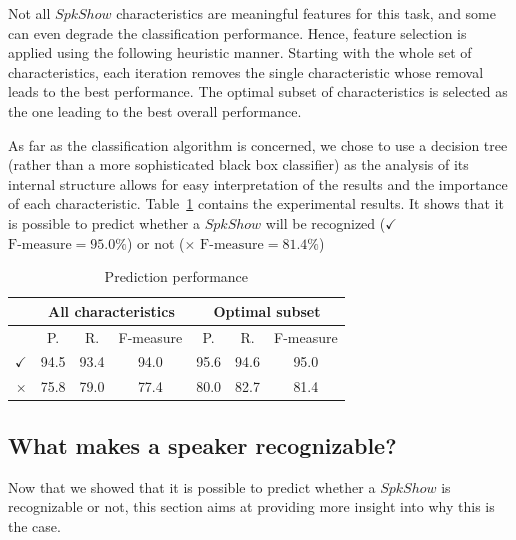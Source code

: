 Not all $SpkShow$ characteristics are meaningful features for this task, and some can even degrade the classification performance. 
Hence, feature selection is applied using the following heuristic manner.
Starting with the whole set of characteristics, each iteration removes the single characteristic whose removal leads to the best performance.
The optimal subset of characteristics is selected as the one leading to the best overall performance.

As far as the classification algorithm is concerned, we chose to use a decision tree (rather than a more sophisticated black box classifier) as the analysis of its internal structure allows for easy interpretation of the results and the importance of each characteristic.
Table~\ref{tableresult} contains the experimental results. It shows that it is possible to predict whether a $SpkShow$ will be recognized ($\checkmark$ $\text{F-measure} = 95.0\%$) or not ($\times$ $\text{F-measure} = 81.4\%$)
\begin{table}[t]
\begin{center}
\begin{tabular}{|r|c|c|c|c|c|c|}
\hline
& \multicolumn{3}{c|}{All characteristics} & \multicolumn{3}{c|}{Optimal subset} \\
\hline
& P. & R. & F-measure & P. & R. & F-measure \\
\hline
$\checkmark$ & 94.5 & 93.4 & 94.0 & 95.6 & 94.6 & 95.0 \\
\hline
$\times$ & 75.8 & 79.0 & 77.4 & 80.0 & 82.7 & 81.4 \\
\hline
\end{tabular}
\caption{Prediction performance}
\label{tableresult}
\end{center}
\end{table}

\subsection{What makes a speaker recognizable?}

Now that we showed that it is possible to predict whether a $SpkShow$ is recognizable or not, this section aims at providing more insight into why this is the case.

